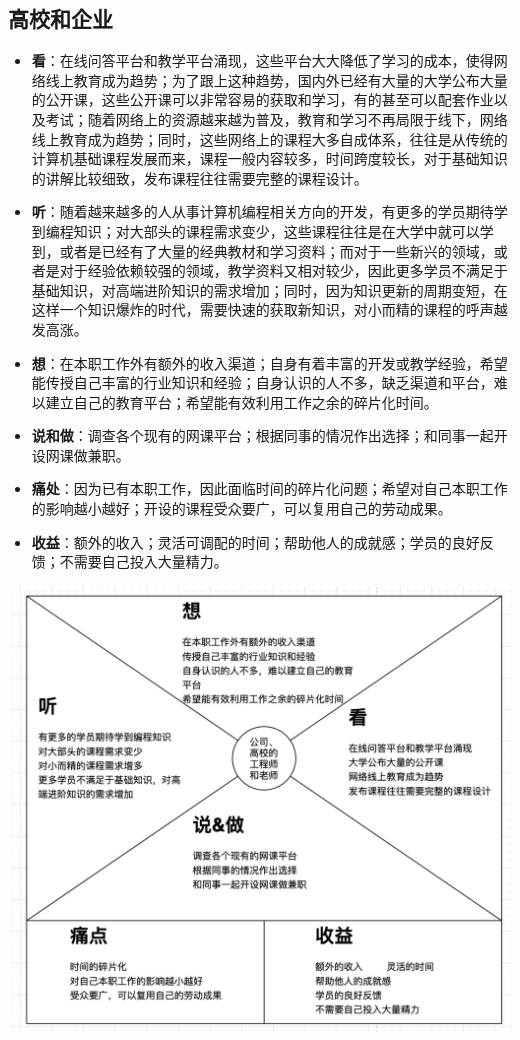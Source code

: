 \documentclass[a4paper]{ctexart}
\begin{document}
\subsection{高校和企业}
\begin{itemize}
  \item \textbf{看}：在线问答平台和教学平台涌现，这些平台大大降低了学习的成本，使得网络线上教育成为趋势；为了跟上这种趋势，国内外已经有大量的大学公布大量的公开课，这些公开课可以非常容易的获取和学习，有的甚至可以配套作业以及考试；随着网络上的资源越来越为普及，教育和学习不再局限于线下，网络线上教育成为趋势；同时，这些网络上的课程大多自成体系，往往是从传统的计算机基础课程发展而来，课程一般内容较多，时间跨度较长，对于基础知识的讲解比较细致，发布课程往往需要完整的课程设计。
  \item \textbf{听}：随着越来越多的人从事计算机编程相关方向的开发，有更多的学员期待学到编程知识；对大部头的课程需求变少，这些课程往往是在大学中就可以学到，或者是已经有了大量的经典教材和学习资料；而对于一些新兴的领域，或者是对于经验依赖较强的领域，教学资料又相对较少，因此更多学员不满足于基础知识，对高端进阶知识的需求增加；同时，因为知识更新的周期变短，在这样一个知识爆炸的时代，需要快速的获取新知识，对小而精的课程的呼声越发高涨。
  \item \textbf{想}：在本职工作外有额外的收入渠道；自身有着丰富的开发或教学经验，希望能传授自己丰富的行业知识和经验；自身认识的人不多，缺乏渠道和平台，难以建立自己的教育平台；希望能有效利用工作之余的碎片化时间。
  \item \textbf{说和做}：调查各个现有的网课平台；根据同事的情况作出选择；和同事一起开设网课做兼职。
  \item \textbf{痛处}：因为已有本职工作，因此面临时间的碎片化问题；希望对自己本职工作的影响越小越好；开设的课程受众要广，可以复用自己的劳动成果。
  \item \textbf{收益}：额外的收入；灵活可调配的时间；帮助他人的成就感；学员的良好反馈；不需要自己投入大量精力。
\end{itemize}

\begin{center}
  \includegraphics[width=14cm]{高校和企业.png}
\end{center}
\end{document}
